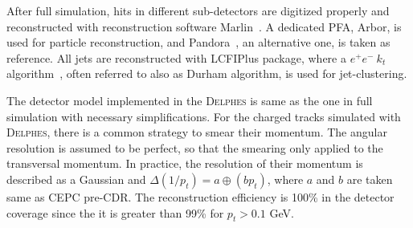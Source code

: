\documentclass[a4paper,10pt,twoside]{cpc-hepnp}
\begin{document}
\begin{multicols}{2}

After full simulation,  hits in different sub-detectors are digitized properly
and reconstructed with reconstruction software  Marlin{~\cite{ref:marlin}}.
A dedicated PFA, Arbor\cite{ref:arbor},  is used for particle reconstruction, and Pandora{~\cite{ref:pandora}}, an alternative one,
is taken as reference. All jets are reconstructed with LCFIPlus package\cite{ref:lcfiplus},
where a $e^+e^-~k_t$ algorithm{~\cite{ref:eekt}},  often referred to also as {\sf Durham} algorithm,  is used for jet-clustering.

The detector model implemented in the {\textsc{Delphes}} is same as the one in full simulation with necessary simplifications.
For the charged tracks simulated with {\textsc{Delphes}}, there is a common strategy to smear their momentum.
The angular resolution is assumed to be perfect, so that the smearing only applied to the transversal momentum.
In practice, the resolution of their momentum is described as a Gaussian and  $\Delta(1/p_t)=a \oplus (b p_t) $,
where $a$ and $b$ are taken same as CEPC pre-CDR.
The reconstruction efficiency is 100\% in the detector coverage since the it is greater than 99\% for $p_t>0.1$ GeV.

\end{multicols}
\end{document}
